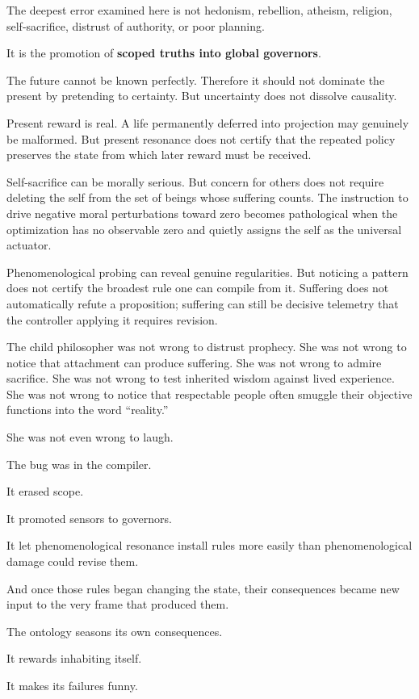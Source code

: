 \documentclass[10pt,letterpaper]{article}
\newenvironment{paperbody}
  {\begingroup\justifying}
  {\par\endgroup}
\begin{document}
\begin{paperbody}
The deepest error examined here is not hedonism, rebellion, atheism,
religion, self-sacrifice, distrust of authority, or poor planning.

It is the promotion of \textbf{scoped truths into global governors}.

The future cannot be known perfectly. Therefore it should not dominate
the present by pretending to certainty. But uncertainty does not
dissolve causality.

Present reward is real. A life permanently deferred into projection may
genuinely be malformed. But present resonance does not certify that the
repeated policy preserves the state from which later reward must be
received.

Self-sacrifice can be morally serious. But concern for others does not
require deleting the self from the set of beings whose suffering counts.
The instruction to drive negative moral perturbations toward zero
becomes pathological when the optimization has no observable zero and
quietly assigns the self as the universal actuator.

Phenomenological probing can reveal genuine regularities. But noticing a
pattern does not certify the broadest rule one can compile from it.
Suffering does not automatically refute a proposition; suffering can
still be decisive telemetry that the controller applying it requires
revision.

The child philosopher was not wrong to distrust prophecy. She was not
wrong to notice that attachment can produce suffering. She was not wrong
to admire sacrifice. She was not wrong to test inherited wisdom against
lived experience. She was not wrong to notice that respectable people
often smuggle their objective functions into the word ``reality.''

She was not even wrong to laugh.

The bug was in the compiler.

It erased scope.

It promoted sensors to governors.

It let phenomenological resonance install rules more easily than
phenomenological damage could revise them.

And once those rules began changing the state, their consequences became
new input to the very frame that produced them.

The ontology seasons its own consequences.

It rewards inhabiting itself.

It makes its failures funny.


\end{paperbody}
\end{document}
